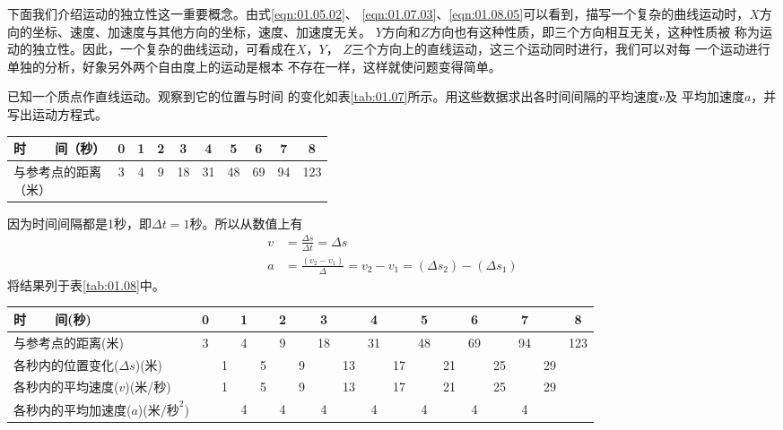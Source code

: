 下面我们介绍运动的独立性这一重要概念。由式\eqref{eqn:01.05.02}、
\eqref{eqn:01.07.03}、\eqref{eqn:01.08.05}可以看到，描写一个复杂的曲线运动时，$X$方
向的坐标、速度、加速度与其他方向的坐标，速度、加速度无关。
$Y$方向和$Z$方向也有这种性质，即三个方向相互无关，这种性质被
称为运动的独立性。因此，一个复杂的曲线运动，可看成在$X$，$Y$，
$Z$三个方向上的直线运动，这三个运动同时进行，我们可以对每
一个运动进行单独的分析，好象另外两个自由度上的运动是根本
不存在一样，这样就使问题变得简单。

 已知一个质点作直线运动。观察到它的位置与时间
的变化如表\ref{tab:01.07}所示。用这些数据求出各时间间隔的平均速度$v$及
平均加速度$a$，并写出运动方程式。
\begin{tablex}[!h]{0.6em}
    \caption{}
    \label{tab:01.07}
    \centering
    \begin{tabular}{l|c|c|c|c|c|c|c|c|c}
        \toprule
        时~~~~间（秒） & 0 & 1 & 2 & 3 & 4 & 5 & 6 & 7 & 8 \\
        \midrule
        \makecell{与参考点的距离                           \\（米）}  &  3  &  4  &  9  &  18  &  31  &  48  &  69  &  94 & 123 \\
        \bottomrule
    \end{tabular}
\end{tablex}

\solution 因为时间间隔都是1秒，即$\Delta t=1$秒。所以从数值上有
\begin{align*}
    v & =\frac{\Delta s}{\Delta t}=\Delta s                         \\
    a & =\frac{(v_2-v_1)}{\Delta}=v_2-v_1=(\Delta s_2)-(\Delta s_1)
\end{align*}
将结果列于表\ref{tab:01.08}中。
\begin{tablex}[!h]{0.2mm}
        \caption{}
        \label{tab:01.08}
        \centering {}
        \begin{tabular}{l|c|c|c|c|c|c|c|c|c|c|c|c|c|c|c|c|c}
            \toprule
            时~~~~间(秒)                              & 0 &   & 1 &   & 2 &   & 3  &    & 4  &    & 5  &    & 6  &    & 7  &    & 8   \\
            \midrule
            与参考点的距离(米)                        & 3 &   & 4 &   & 9 &   & 18 &    & 31 &    & 48 &    & 69 &    & 94 &    & 123 \\
            各秒内的位置变化($\Delta s$)(米)          &   & 1 &   & 5 &   & 9 &    & 13 &    & 17 &    & 21 &    & 25 &    & 29 &     \\
            各秒内的平均速度($v$)(米/秒)              &   & 1 &   & 5 &   & 9 &    & 13 &    & 17 &    & 21 &    & 25 &    & 29 &     \\
            各秒内的平均加速度($a$)($\text{米/秒}^2$) &   &   & 4 &   & 4 &   & 4  &    & 4  &    & 4  &    & 4  &    & 4  &    &     \\
            \bottomrule
        \end{tabular}
\end{tablex}

